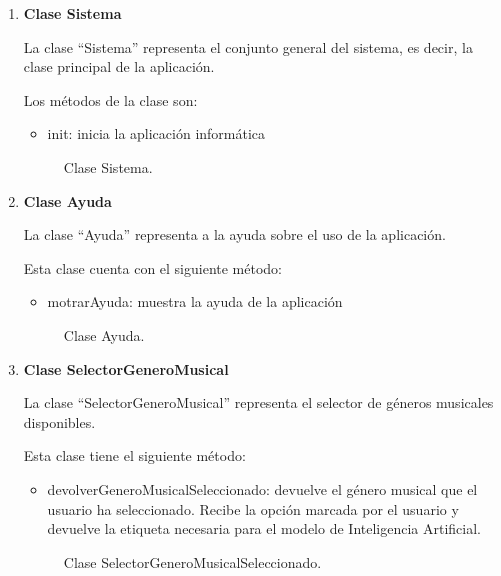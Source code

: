 \begin{enumerate}
  \item \textbf{Clase Sistema}

  La clase ``Sistema'' representa el conjunto general del sistema, es decir, la clase principal de la aplicación.

  Los métodos de la clase son:

  \begin{itemize}
      \item init: inicia la aplicación informática
  \end{itemize}

  \begin{figure}[H]
    \centering
    
    \caption{Clase Sistema.}
  \end{figure}


  \item \textbf{Clase Ayuda}

  La clase ``Ayuda'' representa a la ayuda sobre el uso de la aplicación.

  Esta clase cuenta con el siguiente método:

  \begin{itemize}
      \item motrarAyuda: muestra la ayuda de la aplicación
  \end{itemize}

  \begin{figure}[H]
    \centering
    
    \caption{Clase Ayuda.}
  \end{figure}

  \item \textbf{Clase SelectorGeneroMusical}

  La clase ``SelectorGeneroMusical'' representa el selector de géneros musicales disponibles.

  Esta clase tiene el siguiente método:

  \begin{itemize}
      \item devolverGeneroMusicalSeleccionado: devuelve el género musical que el usuario ha seleccionado. Recibe la opción marcada por el usuario y devuelve la etiqueta necesaria para el modelo de Inteligencia Artificial.
  \end{itemize}

  \begin{figure}[H]
    \centering
    
    \caption{Clase SelectorGeneroMusicalSeleccionado.}
  \end{figure}



\end{enumerate}
